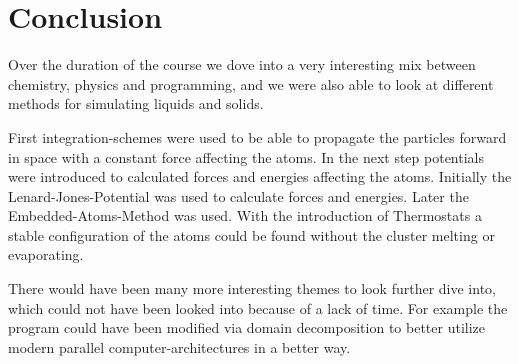 \chapter{Conclusion}
\begin{comment}
- give look at stuff i did and did not
- mention all the other cool stuff, parralell hardware memes domain decompasition looking at other mechanical parameters ia stress
- should be written nice if i wanna work with those guys
-btw the github is actually hilarious although a c++ project over 80%
- personal ?! nah
\end{comment}

Over the duration of the course we dove into a very interesting mix between chemistry, physics and programming, and we were also able to look at different methods for simulating liquids and solids.
\par 
First integration-schemes were used to be able to propagate the particles forward in space with a constant force affecting the atoms. In the next step potentials were introduced to calculated forces and energies affecting the atoms. Initially the Lenard-Jones-Potential was used to calculate forces and energies. Later the Embedded-Atoms-Method was used. With the introduction of Thermostats a stable configuration of the atoms could be found without the cluster melting or evaporating. 
\par
There would have been many more interesting themes to look further dive into, which could not have been looked into because of a lack of time. For example the program could have been modified via domain decomposition to better utilize modern parallel computer-architectures in a better way. 
